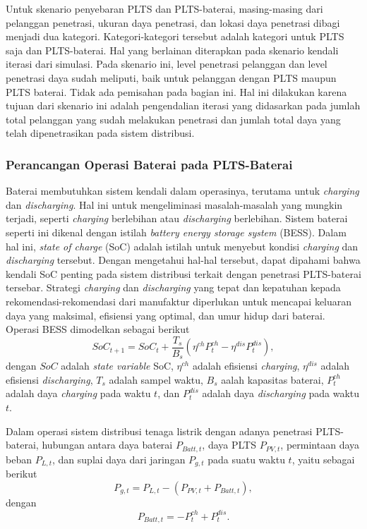 {Untuk skenario penyebaran PLTS dan PLTS-baterai, masing-masing dari pelanggan penetrasi, ukuran daya penetrasi, dan lokasi daya penetrasi dibagi menjadi dua kategori. Kategori-kategori tersebut adalah kategori untuk PLTS saja dan PLTS-baterai. Hal yang berlainan diterapkan pada skenario kendali iterasi dari simulasi. Pada skenario ini, level penetrasi pelanggan dan level penetrasi daya sudah meliputi, baik untuk pelanggan dengan PLTS maupun PLTS baterai. Tidak ada pemisahan pada bagian ini. Hal ini dilakukan karena tujuan dari skenario ini adalah pengendalian iterasi yang didasarkan pada jumlah total pelanggan yang sudah melakukan penetrasi dan jumlah total daya yang telah dipenetrasikan pada sistem distribusi.

\subsubsection{Perancangan Operasi Baterai pada PLTS-Baterai}
Baterai membutuhkan sistem kendali dalam operasinya, terutama untuk \textit{charging} dan \textit{discharging}. Hal ini untuk mengeliminasi masalah-masalah yang mungkin terjadi, seperti \textit{charging} berlebihan atau \textit{discharging} berlebihan. Sistem baterai seperti ini dikenal dengan istilah \textit{battery energy storage system} (BESS). Dalam hal ini, \textit{state of charge} (SoC) adalah istilah untuk menyebut kondisi \textit{charging} dan \textit{discharging} tersebut. Dengan mengetahui hal-hal tersebut, dapat dipahami bahwa kendali SoC penting pada sistem distribusi terkait dengan penetrasi PLTS-baterai tersebar. Strategi \textit{charging} dan \textit{discharging} yang tepat dan kepatuhan kepada rekomendasi-rekomendasi dari manufaktur diperlukan untuk mencapai keluaran daya yang maksimal, efisiensi yang optimal, dan umur hidup dari baterai. Operasi BESS dimodelkan sebagai berikut
\begin{equation}\label{batt1}
	SoC_{t+1}=SoC_t + \frac{T_s}{B_s}(\eta^{ch}P^{ch}_t - \eta^{dis}P^{dis}_t),
\end{equation}
dengan $SoC$ adalah \textit{state variable} SoC, $\eta^{ch}$ adalah efisiensi \textit{charging}, $\eta^{dis}$ adalah efisiensi \textit{discharging}, $T_s$ adalah sampel waktu, $B_s$ aalah kapasitas baterai, $P^{ch}_t$ adalah daya \textit{charging} pada waktu $t$, dan $P^{dis}_t$ adalah daya \textit{discharging} pada waktu $t$.

Dalam operasi sistem distribusi tenaga listrik dengan adanya penetrasi PLTS-baterai, hubungan antara daya baterai $P_{Batt,t}$, daya PLTS $P_{PV,t}$, permintaan daya beban $P_{L,t}$, dan suplai daya dari jaringan $P_{g,t}$ pada suatu waktu $t$, yaitu sebagai berikut
\begin{equation}\label{batt2}
	P_{g,t} = P_{L,t} - (P_{PV,t} + P_{Batt,t}),
\end{equation}
dengan
\begin{equation}\label{batt2}
	P_{Batt,t} = -P^{ch}_t + P^{dis}_t.
\end{equation}
}
